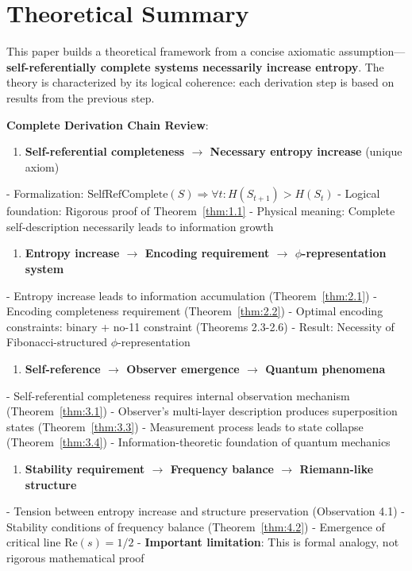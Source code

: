 
\section{Theoretical Summary}
\label{sec:ch06_conclusion:theoretical-summary}

This paper builds a theoretical framework from a concise axiomatic assumption---\textbf{self-referentially complete systems necessarily increase entropy}. The theory is characterized by its logical coherence: each derivation step is based on results from the previous step.

\textbf{Complete Derivation Chain Review}:

\begin{enumerate}
\item \textbf{Self-referential completeness $\rightarrow$ Necessary entropy increase} (unique axiom)
\end{enumerate}
   - Formalization: $\text{SelfRefComplete}(S) \Rightarrow \forall t: H(S_{t+1}) > H(S_t)$
   - Logical foundation: Rigorous proof of Theorem~\ref{thm:1.1}
   - Physical meaning: Complete self-description necessarily leads to information growth

\begin{enumerate}
\item \textbf{Entropy increase $\rightarrow$ Encoding requirement $\rightarrow$ $\phi$-representation system}
\end{enumerate}
   - Entropy increase leads to information accumulation (Theorem~\ref{thm:2.1})
   - Encoding completeness requirement (Theorem~\ref{thm:2.2})
   - Optimal encoding constraints: binary + no-11 constraint (Theorems 2.3-2.6)
   - Result: Necessity of Fibonacci-structured $\phi$-representation

\begin{enumerate}
\item \textbf{Self-reference $\rightarrow$ Observer emergence $\rightarrow$ Quantum phenomena}
\end{enumerate}
   - Self-referential completeness requires internal observation mechanism (Theorem~\ref{thm:3.1})
   - Observer's multi-layer description produces superposition states (Theorem~\ref{thm:3.3})
   - Measurement process leads to state collapse (Theorem~\ref{thm:3.4})
   - Information-theoretic foundation of quantum mechanics

\begin{enumerate}
\item \textbf{Stability requirement $\rightarrow$ Frequency balance $\rightarrow$ Riemann-like structure}
\end{enumerate}
   - Tension between entropy increase and structure preservation (Observation 4.1)
   - Stability conditions of frequency balance (Theorem~\ref{thm:4.2})
   - Emergence of critical line $\text{Re}(s)=1/2$
   - \textbf{Important limitation}: This is formal analogy, not rigorous mathematical proof

